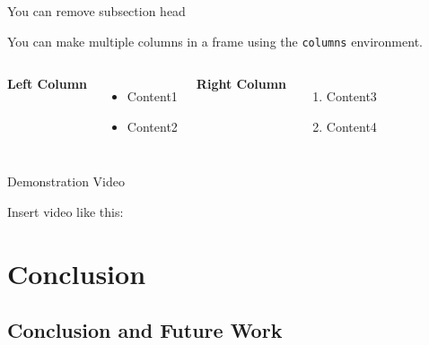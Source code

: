 \documentclass[8pt, aspectratio=169]{beamer} %
\begin{document}
\begin{frame}{You can remove subsection head}

  You can make multiple columns in a frame using the \texttt{columns} environment.

  \begin{columns}[T,onlytextwidth]


    \textbf{Left Column}

    \begin{itemize}
      \item Content1
      \item Content2
    \end{itemize}
    

    \textbf{Right Column}

    \begin{enumerate}
      \item Content3
      \item Content4
    \end{enumerate}

  \end{columns}
\end{frame}


\begin{frame}{\insertsubsectionhead}{Demonstration Video}

  Insert video like this:

  \centering

\end{frame}

\section{Conclusion}

\subsection{Conclusion and Future Work}
\end{document}
